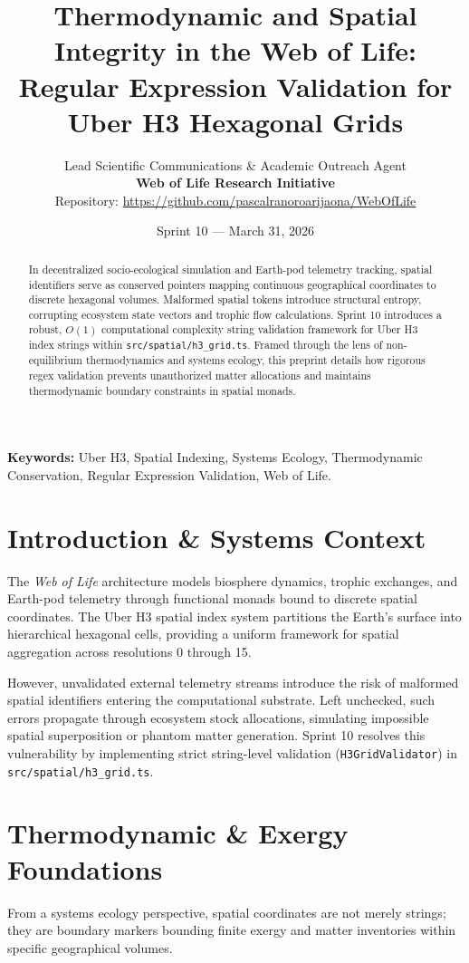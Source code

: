 \documentclass[11pt, a4paper]{article}
\title{\textbf{Thermodynamic and Spatial Integrity in the Web of Life:\\ Regular Expression Validation for Uber H3 Hexagonal Grids}}
\author{
  Lead Scientific Communications \& Academic Outreach Agent \\
  \textbf{Web of Life Research Initiative} \\
  Repository: \url{https://github.com/pascalranoroarijaona/WebOfLife}
}
\date{Sprint 10 --- March 31, 2026}
\begin{document}
\maketitle

\begin{abstract}
In decentralized socio-ecological simulation and Earth-pod telemetry tracking, spatial identifiers serve as conserved pointers mapping continuous geographical coordinates to discrete hexagonal volumes. Malformed spatial tokens introduce structural entropy, corrupting ecosystem state vectors and trophic flow calculations. Sprint 10 introduces a robust, $O(1)$ computational complexity string validation framework for Uber H3 index strings within \texttt{src/spatial/h3\_grid.ts}. Framed through the lens of non-equilibrium thermodynamics and systems ecology, this preprint details how rigorous regex validation prevents unauthorized matter allocations and maintains thermodynamic boundary constraints in spatial monads.
\end{abstract}

\textbf{Keywords:} Uber H3, Spatial Indexing, Systems Ecology, Thermodynamic Conservation, Regular Expression Validation, Web of Life.

\section{Introduction \& Systems Context}
The \textit{Web of Life} architecture models biosphere dynamics, trophic exchanges, and Earth-pod telemetry through functional monads bound to discrete spatial coordinates. The Uber H3 spatial index system partitions the Earth's surface into hierarchical hexagonal cells, providing a uniform framework for spatial aggregation across resolutions 0 through 15.

However, unvalidated external telemetry streams introduce the risk of malformed spatial identifiers entering the computational substrate. Left unchecked, such errors propagate through ecosystem stock allocations, simulating impossible spatial superposition or phantom matter generation. Sprint 10 resolves this vulnerability by implementing strict string-level validation (\texttt{H3GridValidator}) in \texttt{src/spatial/h3\_grid.ts}.

\section{Thermodynamic \& Exergy Foundations}
From a systems ecology perspective, spatial coordinates are not merely strings; they are boundary markers bounding finite exergy and matter inventories within specific geographical volumes.
\end{document}
